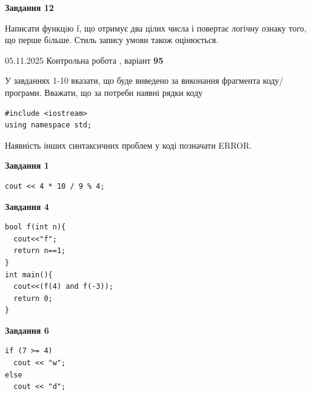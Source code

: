 \documentclass[12pt, ukrainian]{article}
\begin{document}
{\begin {large}
\begin{minipage}[t]{11.0cm}
\begin{center}
\textbf{Завдання 12}
\end{center}

Написати функцiю f, що отримує два цілих числа і повертає логічну ознаку того, що перше бiльше. Стиль запису умови також оцінюється.\par

\end{minipage}

\end {large}}
\newpage

{\Large{05.11.2025 Контрольна робота , варіант  \No \textbf { 95 }\par}}
{
\begin {large}
У завданнях 1-10 вказати, що буде виведено за виконання фрагмента коду/про\-гра\-ми.
Вважати, що за потреби наявні рядки коду
\begin{verbatim}
#include <iostream>
using namespace std;
\end{verbatim}
Наявність інших синтаксичних проблем у коді позначати ERROR.

\begin{minipage}[t]{7.0cm}

\begin{center}
\textbf{Завдання 1}
\end{center}
\vspace{-8mm}

\begin{verbatim}
cout << 4 * 10 / 9 % 4;
\end{verbatim}



\begin{center}
\textbf{Завдання 4}
\end{center}
\vspace{-8mm}

\begin{verbatim}
bool f(int n){
  cout<<"f";
  return n==1;
}
int main(){
  cout<<(f(4) and f(-3));
  return 0;
}
\end{verbatim}



\begin{center}
\textbf{Завдання 6}
\end{center}
\vspace{-8mm}

\begin{verbatim}
if (7 >= 4)
  cout << "w";
else
  cout << "d";
\end{verbatim}




\end{minipage}
\end{large}}
\end{document}
